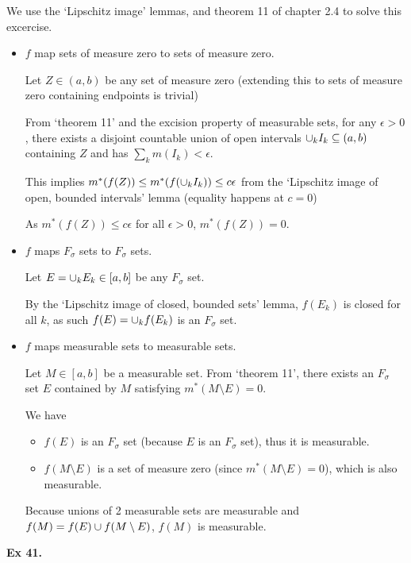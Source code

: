 \noindent We use the `Lipschitz image' lemmas, and theorem 11 of chapter 2.4 to solve this excercise.
\begin{itemize}
    \item $f$ map sets of measure zero to sets of measure zero.

    Let $Z \in (a,b)$ be any set of measure zero (extending this to sets of measure zero containing endpoints is trivial)


    From `theorem 11' and the excision property of measurable sets, for any $\epsilon > 0$, there exists a disjoint countable union of open intervals $\cup_k I_k \subseteq (a,b)$ containing $Z$ and has $ \sum_k m(I_k) < \epsilon$.
    
    This implies $m^\ast(f(Z)) \leq m^\ast(f(\cup_k I_k)) \leq c\epsilon$ from the `Lipschitz image of open, bounded intervals' lemma (equality happens at $c=0$)

    As $m^\ast(f(Z)) \leq c\epsilon$ for all $\epsilon > 0$, $m^\ast(f(Z)) = 0$.

    \item $f$ maps $F_\sigma$ sets to $F_\sigma$ sets.
    
    Let $E = \cup_k E_k \in [a,b]$ be any $F_\sigma$ set.

    By the `Lipschitz image of closed, bounded sets' lemma, $f(E_k)$ is closed for all $k$, as such $f(E) = \cup_k f(E_k)$ is an $F_\sigma$ set.

    \item $f$ maps measurable sets to measurable sets.
    
    Let $M \in [a,b]$ be a measurable set. From `theorem 11', there exists an $F_\sigma$ set $E$ contained by $M$ satisfying $m^\ast(M \setminus E) = 0$.

    We have
    \begin{itemize}
        \item[] $f(E)$ is an $F_\sigma$ set (because $E$ is an $F_\sigma$ set), thus it is measurable.
        \item[] $f(M\setminus E)$ is a set of measure zero (since $m^\ast(M\setminus E) = 0$), which is also measurable.
    \end{itemize}
    Because unions of 2 measurable sets are measurable and $f(M) = f(E) \cup f(M\setminus E)$, $f(M)$ is measurable.
\end{itemize}


\noindent {} \textbf{Ex 41.} \label{ex:2_41}

